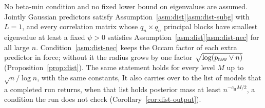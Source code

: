 
\begin{remark}\label{rem:dist-asm}
No beta-min condition and no fixed lower bound on eigenvalues are assumed. Jointly Gaussian predictors satisfy Assumption~\ref{asm:dist}\ref{asm:dist-subg} with $L=1$, and every correlation matrix whose $q_n\times q_n$
principal blocks have smallest eigenvalue at least a fixed $\psi>0$ satisfies Assumption~\ref{asm:dist}\ref{asm:dist-nec}
for all large $n$. Condition~\ref{asm:dist-nec} keeps the Occam factor of each extra predictor in force; without it the
radius grows by one factor $\sqrt{\log(p_{\mathrm{raw}}\vee n)}$ (Proposition~\ref{prop:dist}). The same statement holds for every
level $M$ up to $\sqrt n/\log n$, with the same constants, It also carries over to the list of models that a completed run returns,
when that list holds posterior mass at least $n^{-c_{\mathrm H}M/2}$, a condition the run does not check
(Corollary~\ref{cor:dist-output}).
\end{remark}
